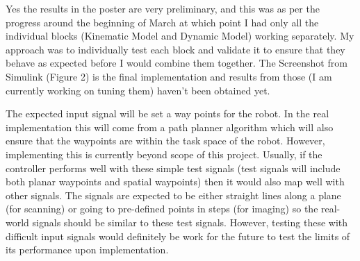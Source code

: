 \documentclass[a4paper,12pt]{article}
\begin{document}
Yes the results in the poster are very preliminary, and this was as per the progress around the beginning of March at which point I had only all the individual blocks (Kinematic Model and Dynamic Model) working separately. My approach was to individually test each block and validate it to ensure that they behave as expected before I would combine them together. The Screenshot from Simulink (Figure 2) is the final implementation and results from those (I am currently working on tuning them) haven’t been obtained yet. 

The expected input signal will be set a way points for the robot. In the real implementation this will come from a path planner algorithm which will also ensure that the waypoints are within the task space of the robot. However, implementing this is currently beyond scope of this project. Usually, if the controller performs well with these simple test signals (test signals will include both planar waypoints and spatial waypoints) then it would also map well with other signals. The signals are expected to be either straight lines along a plane (for scanning) or going to pre-defined points in steps (for imaging) so the real-world signals should be similar to these test signals. However, testing these with difficult input signals would definitely be work for the future to test the limits of its performance upon implementation.

\pagebreak


\end{document}
